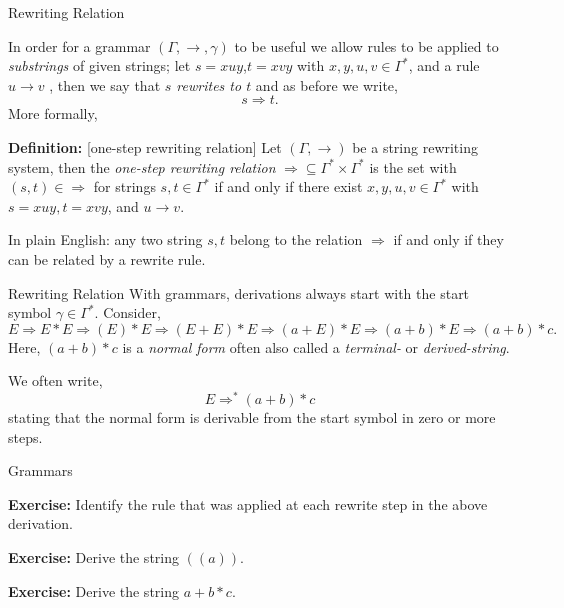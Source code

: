 \documentclass{beamer}
\begin{document}
\begin{frame}[fragile]{Rewriting Relation}

\small
In order for a grammar $(\Gamma,\rightarrow,\gamma)$ to be useful we allow rules
to be applied to {\em substrings} of given strings;
let $s = xuy$,$t=xvy$ with $x,y,u,v \in \Gamma^*$, and a rule $u\rightarrow v$ ,
then we say that {\em $s$ rewrites to $t$} and as before we write,
\[
s \Rightarrow t.
\]
More formally,

\vspace{.1in}
{\bf Definition:} [one-step rewriting relation] Let $(\Gamma,\rightarrow)$ be a string rewriting system,
then the {\em one-step rewriting relation} $\Rightarrow\subseteq \Gamma^*\times\Gamma^*$ is  the set with $(s,t) \in \Rightarrow$ for strings $s,t \in\Gamma^*$
 if and only if there exist $x, y, u, v \in\Gamma^*$ with $s = xuy, t = xvy$, and $u\rightarrow v $.

\vspace{.1in}
In plain English: any two string $s,t$ belong to the relation $\Rightarrow$ if and only if they can be related by
a rewrite rule.
\end{frame}



\begin{frame}[fragile]{Rewriting Relation}
With grammars, derivations always start with the start symbol $\gamma \in \Gamma^*$. Consider,
\[
E\Rightarrow E * E \Rightarrow ( E ) * E \Rightarrow ( E + E ) * E \Rightarrow (a + E) * E \Rightarrow (a + b) * E
\Rightarrow (a + b) * c.
\]
Here, $(a+b)*c$ is a {\em normal form} often also called a {\em terminal-} or {\em derived-string}.

We often write,
\[
E \Rightarrow^* (a + b) * c
\]
stating that the normal form is derivable from the start symbol in zero or more steps.
\end{frame}




\begin{frame}[fragile]{Grammars}

{\bf Exercise:} Identify the rule that was applied at each rewrite step in the above derivation.

{\bf Exercise:} Derive the string $((a))$.

{\bf Exercise:} Derive the string $a + b * c$.

\end{frame}
\end{document}
